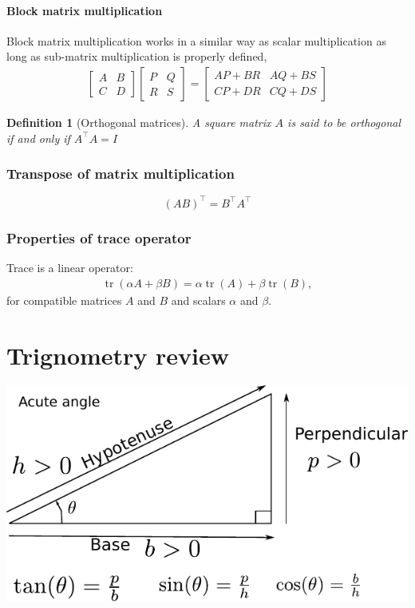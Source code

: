 \documentclass[twocolumn]{article}
\newtheorem{defn}{Definition}
\DeclareMathOperator{\tr}{tr}
\begin{document}
\paragraph{Block matrix  multiplication}
Block matrix multiplication works in a similar way  as scalar multiplication as
long as sub-matrix multiplication is properly defined,
%
\begin{align}
  \begin{bmatrix}  A & B \\  C &  D \end{bmatrix}
  \begin{bmatrix}  P & Q \\  R &  S \end{bmatrix}
 =
   \begin{bmatrix}  AP+BR & AQ+BS \\  CP+DR &  CQ+DS \end{bmatrix}
  \end{align}

\begin{defn}[Orthogonal matrices]
  A square matrix $A$ is said to be orthogonal if and only if $A^\top A = I$
\end{defn}

\subsubsection{Transpose of matrix multiplication}
\[
  (AB)^\top = B^\top A^\top
  \]

\subsubsection{Properties of trace  operator}
Trace is a linear operator:
\begin{align}
  \tr(\alpha A  +  \beta B) = \alpha \tr(A) +  \beta \tr(B),
\end{align}
for compatible matrices  $A$ and $B$   and scalars $\alpha$ and $\beta$.

\section{Trignometry review}
\includegraphics[width=\linewidth]{media/trig.pdf}
\end{document}
